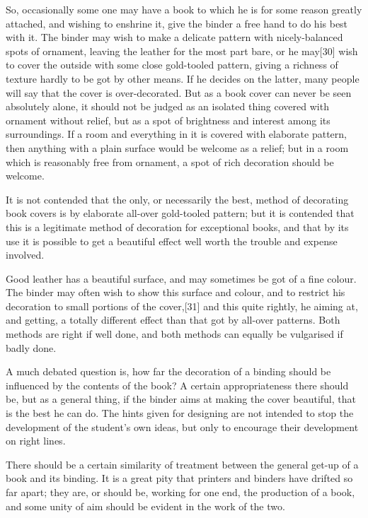\documentclass[
]{article}
\begin{document}
So, occasionally some one may have a book to which he is for some reason
greatly attached, and wishing to enshrine it, give the binder a free
hand to do his best with it. The binder may wish to make a delicate
pattern with nicely-balanced spots of ornament, leaving the leather for
the most part bare, or he may{\protect\hypertarget{Page_30}{}{{[}30{]}}}
wish to cover the outside with some close gold-tooled pattern, giving a
richness of texture hardly to be got by other means. If he decides on
the latter, many people will say that the cover is over-decorated. But
as a book cover can never be seen absolutely alone, it should not be
judged as an isolated thing covered with ornament without relief, but as
a spot of brightness and interest among its surroundings. If a room and
everything in it is covered with elaborate pattern, then anything with a
plain surface would be welcome as a relief; but in a room which is
reasonably free from ornament, a spot of rich decoration should be
welcome.

It is not contended that the only, or necessarily the best, method of
decorating book covers is by elaborate all-over gold-tooled pattern; but
it is contended that this is a legitimate method of decoration for
exceptional books, and that by its use it is possible to get a beautiful
effect well worth the trouble and expense involved.

Good leather has a beautiful surface, and may sometimes be got of a fine
colour. The binder may often wish to show this surface and colour, and
to restrict his decoration to small portions of the
cover,{\protect\hypertarget{Page_31}{}{{[}31{]}}} and this quite
rightly, he aiming at, and getting, a totally different effect than that
got by all-over patterns. Both methods are right if well done, and both
methods can equally be vulgarised if badly done.

A much debated question is, how far the decoration of a binding should
be influenced by the contents of the book? A certain appropriateness
there should be, but as a general thing, if the binder aims at making
the cover beautiful, that is the best he can do. The hints given for
designing are not intended to stop the development of the student's own
ideas, but only to encourage their development on right lines.

There should be a certain similarity of treatment between the general
get-up of a book and its binding. It is a great pity that printers and
binders have drifted so far apart; they are, or should be, working for
one end, the production of a book, and some unity of aim should be
evident in the work of the two.
\end{document}

